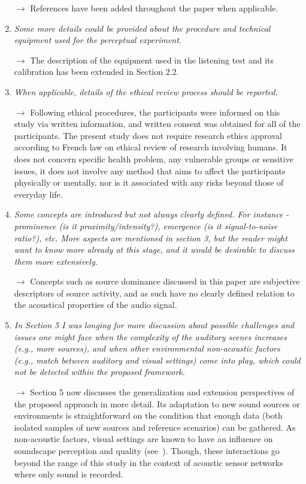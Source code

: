 \documentclass[10pt]{article}
\begin{document}
\begin{enumerate}
$\rightarrow$ References have been added throughout the paper when applicable.

\item \emph{Some more details could be provided about the procedure and technical equipment used for the perceptual experiment.}

$\rightarrow$ The description of the equipment used in the listening test and its calibration has been extended in Section 2.2.

\item \emph{When applicable, details of the ethical review process should be reported.}

$\rightarrow$ Following ethical procedures, the participants were informed on this study via written information, and written consent was obtained for all of the participants. The present study does not require research ethics approval according to French law on ethical review of research involving humans. It does not concern specific health problem, any vulnerable groups or sensitive issues, it does not involve any method that aims to affect the participants physically or mentally, nor is it associated with any risks beyond those of everyday life.

\item \emph{Some concepts are introduced but not always clearly defined. For instance - prominence (is it proximity/intensity?), emergence (is it signal-to-noise ratio?), etc. More aspects are mentioned in section 3, but the reader might want to know more already at this stage, and it would be desirable to discuss them more extensively.}

$\rightarrow$ Concepts such as source dominance discussed in this paper are subjective descriptors of source activity, and as such have no clearly defined relation to the acoustical properties of the audio signal.

\item \emph{In Section 5 I was longing for more discussion about possible challenges and issues one might face when the complexity of the auditory scenes increases (e.g., more sources), and when other environmental non-acoustic factors (e.g., match between auditory and visual settings) come into play, which could not be detected within the proposed framework.}

$\rightarrow$ Section 5 now discusses the generalization and extension perspectives of the proposed approach in more detail. Its adaptation to new sound sources or environments is straightforward on the condition that enough data (both isolated samples of new sources and reference scenarios) can be gathered. As non-acoustic factors, visual settings are known to have an influence on soundscape perception and quality (see~\cite{viollon2002, ricciardi2014, pheasant2008}). Though, these interactions go beyond the range of this study in the context of acoustic sensor networks where only sound is recorded.

\end{enumerate}
\end{document}
